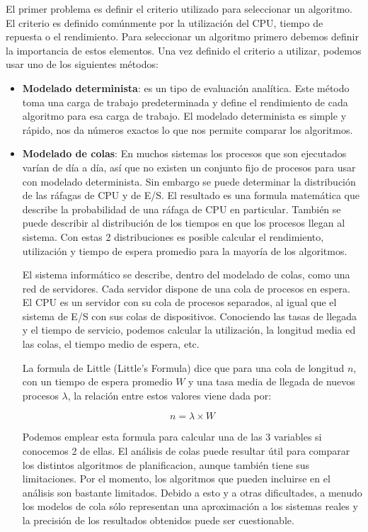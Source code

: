 \documentclass{article}
\begin{document}
El primer problema es definir el criterio utilizado para seleccionar un algoritmo.
El criterio es definido comúnmente por la utilización del CPU, tiempo de repuesta o el rendimiento.
Para seleccionar un algoritmo primero debemos definir la importancia de estos elementos.
Una vez definido el criterio a utilizar, podemos usar uno de los siguientes métodos:
\vspace{0.2cm}
\begin{itemize}
	\item \textbf{Modelado determinista}: es un tipo de evaluación analítica. Este método toma una carga de
	trabajo predeterminada y define el rendimiento de cada algoritmo para esa carga de trabajo. El modelado
	determinista es simple y rápido, nos da números exactos lo que nos permite comparar los algoritmos.
	\vspace{0.08cm}
	
	\item \textbf{Modelado de colas}: En muchos sistemas los procesos que son ejecutados varían de día a día, así
	que no existen un conjunto fijo de procesos para usar con modelado determinista. Sin embargo se puede determinar
	la distribución de las ráfagas de CPU y de E/S.
	El resultado es una formula matemática que describe la probabilidad de una ráfaga de CPU en particular.
	También se puede describir al distribución de los tiempos en que los procesos llegan al sistema.
	Con estas 2 distribuciones es posible calcular el rendimiento, utilización y tiempo de espera promedio
	para la mayoría de los algoritmos.
	
	El sistema informático se describe, dentro del modelado de colas, como una red de servidores. Cada servidor dispone
	de una cola de procesos en espera. El CPU es un servidor con su cola de procesos separados, al igual que el sistema
	de E/S con sus colas de dispositivos. Conociendo las tasas de llegada y el tiempo de servicio, podemos calcular la
	utilización, la longitud media ed las colas, el tiempo medio de espera, etc.
	
	La formula de Little (Little's Formula) dice que para una cola de longitud $n$, con un tiempo de espera promedio
	$W$ y una tasa media de llegada de nuevos procesos $\lambda$, la relación entre estos valores viene dada por:
	
	\begin{equation} \label{eq:little}
		n = \lambda \times W
	\end{equation}
	
	Podemos emplear esta formula para calcular una de las 3 variables si conocemos 2 de ellas.
	El análisis de colas puede resultar útil para comparar los distintos algoritmos de planificacion, aunque también
	tiene sus limitaciones. Por el momento, los algoritmos que pueden incluirse en el análisis son bastante limitados.
	Debido a esto y a otras dificultades, a menudo los modelos de cola sólo representan una aproximación a los sistemas 
	reales y la precisión de los resultados obtenidos puede ser cuestionable.
	\vspace{0.08cm}
	

\end{itemize}
\end{document}
